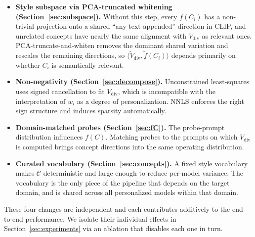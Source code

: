 \begin{itemize}
\item \textbf{Style subspace via PCA-truncated whitening
      (Section~\ref{sec:subspace}).}
      Without this step, every $f(C_i)$ has a non-trivial projection onto a
      shared ``any-text-appended'' direction in CLIP, and unrelated concepts
      have nearly the same alignment with $V_{\mathrm{div}}$ as relevant
      ones. PCA-truncate-and-whiten removes the dominant shared variation
      and rescales the remaining directions, so $\langle
      \widetilde{V}_{\mathrm{div}},\widetilde{f}(C_i)\rangle$ depends
      primarily on whether $C_i$ is semantically relevant.

\item \textbf{Non-negativity (Section~\ref{sec:decompose}).}
      Unconstrained least-squares uses signed cancellation to fit
      $V_{\mathrm{div}}$, which is incompatible with the interpretation of
      $w_i$ as a degree of personalization. NNLS enforces the right sign
      structure and induces sparsity automatically.

\item \textbf{Domain-matched probes (Section~\ref{sec:fC}).}
      The probe-prompt distribution influences $f(C)$. Matching probes to
      the prompts on which $V_{\mathrm{div}}$ is computed brings concept
      directions into the same operating distribution.

\item \textbf{Curated vocabulary (Section~\ref{sec:concepts}).}
      A fixed style vocabulary makes $\mathcal{C}$ deterministic and large
      enough to reduce per-model variance. The vocabulary is the only piece
      of the pipeline that depends on the target domain, and is shared
      across all personalized models within that domain.
\end{itemize}

These four changes are independent and each contributes additively to the
end-to-end performance. We isolate their individual effects in
Section~\ref{sec:experiments} via an ablation that disables each one in
turn.
